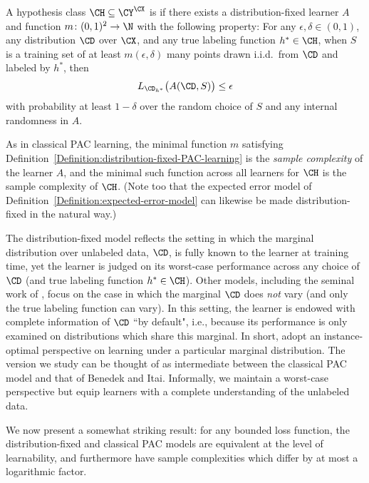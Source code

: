 \documentclass[11pt]{article}
\begin{document}
\begin{definition}\label{Definition:distribution-fixed-PAC-learning}
A hypothesis class $\CH \subseteq \CY^\CX$ is  if there exists a distribution-fixed learner $A$ and function $m \colon (0, 1)^2 \to \N$ with the following property: For any $\epsilon, \delta \in (0, 1)$, any distribution $\CD$ over $\CX$, and any true labeling function $h^* \in \CH$, when $S$ is a training set of at least $m(\epsilon, \delta)$ many points drawn i.i.d.\ from $\CD$ and labeled by $h^*$, then 
\[ L_{\CD_{h^*}} \big( A(\CD, S) \big) \leq \epsilon \]
with probability at least $1 - \delta$ over the random choice of $S$ and any internal randomness in $A$. 
\end{definition}

As in classical PAC learning, the minimal function $m$ satisfying Definition~\ref{Definition:distribution-fixed-PAC-learning} is the \emph{sample complexity} of the learner $A$, and the minimal such function across all learners for $\CH$ is the sample complexity of $\CH$. (Note too that the expected error model of Definition~\ref{Definition:expected-error-model} can likewise be made distribution-fixed in the natural way.) 

\begin{remark}
The distribution-fixed model reflects the setting in which the marginal distribution over unlabeled data, $\CD$, is fully known to the learner at training time, yet the learner is judged on its worst-case performance across any choice of $\CD$ (and true labeling function $h^* \in \CH$). Other models, including the seminal work of \citet{benedek1991learnability}, focus on the case in which the marginal $\CD$ does \emph{not} vary (and only the true labeling function can vary). In this setting, the learner is endowed with complete information of $\CD$ ``by default", i.e., because its performance is only examined on distributions which share this marginal. In short, \citet{benedek1991learnability} adopt an instance-optimal perspective on learning under a particular marginal distribution. The version we study can be thought of as intermediate between the classical PAC model and that of Benedek and Itai. Informally, we maintain a worst-case perspective but equip learners with a complete understanding of the unlabeled data. 
\end{remark}

We now present a somewhat striking result: for any bounded loss function, the distribution-fixed and classical PAC models are equivalent at the level of learnability, and furthermore have sample complexities which differ by at most a logarithmic factor. 
\end{document}
